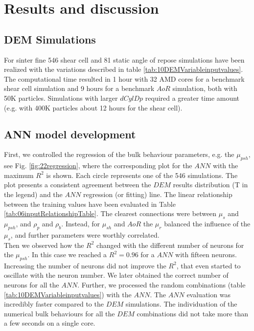 \section{Results and discussion}
\label{sec:results}



\subsection{DEM Simulations}
\label{subsec:simulations}

For sinter fine 546 shear cell and 81 static angle of repose simulations have
been realized with the variations described in table
\ref{tab:10DEMVariableinputvalues}.
The computational time resulted in 1 hour with 32 AMD cores for a benchmark
shear cell simulation and 9 hours for a benchmark $AoR$ simulation, both with 50K particles. 
Simulations with larger $dCylDp$ required a greater time amount (e.g. with 400K
particles about 12 hours for the shear cell). \\


\subsection{ANN model development}
\label{subsec:annmodeldev}

First, we controlled the regression of the bulk behaviour parameters, e.g. the
$\mu_{psh}$, see Fig. \ref{fig:22regression}, where the corresponding plot for
the $ANN$ with the maximum $R^2$ is shown. Each circle represents one of the 546
simulations.
The plot presents a consistent agreement between the $DEM$ results distribution
(T in the legend) and the $ANN$ regression (or fitting) line.
The linear relationship between the
training values have been evaluated in Table \ref{tab:06inputRelationshipTable}.
The clearest connections were between $\mu_s$ and $\mu_{psh}$, and
$\rho_p$ and $\rho_b$.
Instead, for $\mu_{sh}$ and $AoR$ the $\mu_r$ balanced the influence of the 
$\mu_s$, and further parameters were worthly correlated. \\
Then we observed how the $R^2$ changed with the different number of neurons for the $\mu_{psh}$. 
In this case we reached a $R^2 = 0.96$ for a $ANN$ with fifteen neurons. 
Increasing the number of neurons did not improve the $R^2$, that even started to oscillate with the neuron number. 
We later obtained the correct number of neurons for all the $ANN$.
Further, we processed the random combinations (table
\ref{tab:10DEMVariableinputvalues}) with the $ANN$.
The $ANN$ evaluation was incredibly faster compared to the $DEM$ simulations. The
individuation of the numerical bulk behaviours for all the $DEM$ combinations
did not take more than a few seconds on a single core.




